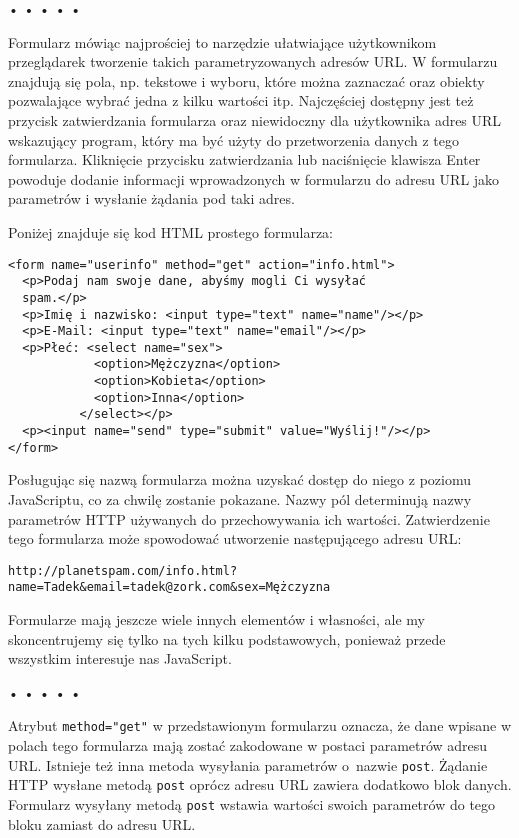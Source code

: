 \begin{center}
• • • • •
\end{center}

  
Formularz mówiąc najprościej to narzędzie ułatwiające użytkownikom przeglądarek tworzenie takich parametryzowanych adresów URL. W formularzu znajdują się pola, np. tekstowe i wyboru, które można zaznaczać oraz obiekty pozwalające wybrać jedna z kilku wartości itp. Najczęściej dostępny jest też przycisk zatwierdzania formularza oraz niewidoczny dla użytkownika adres URL wskazujący program, który ma być użyty do przetworzenia danych z tego formularza. Kliknięcie przycisku zatwierdzania lub naciśnięcie klawisza Enter powoduje dodanie informacji wprowadzonych w formularzu do adresu URL jako parametrów i wysłanie żądania pod taki adres.

  
Poniżej znajduje się kod HTML prostego formularza:

  
\begin{verbatim} 
<form name="userinfo" method="get" action="info.html">
  <p>Podaj nam swoje dane, abyśmy mogli Ci wysyłać
  spam.</p>
  <p>Imię i nazwisko: <input type="text" name="name"/></p>
  <p>E-Mail: <input type="text" name="email"/></p>
  <p>Płeć: <select name="sex">
            <option>Mężczyzna</option>
            <option>Kobieta</option>
            <option>Inna</option>
          </select></p>
  <p><input name="send" type="submit" value="Wyślij!"/></p>
</form>
 \end{verbatim}
  
Posługując się nazwą formularza można uzyskać dostęp do niego z poziomu JavaScriptu, co za chwilę zostanie pokazane. Nazwy pól determinują nazwy parametrów HTTP używanych do przechowywania ich wartości. Zatwierdzenie tego formularza może spowodować utworzenie następującego adresu URL:

  
\begin{verbatim} 
http://planetspam.com/info.html?name=Tadek&email=tadek@zork.com&sex=Mężczyzna
\end{verbatim}
  
Formularze mają jeszcze wiele innych elementów i własności, ale my skoncentrujemy się tylko na tych kilku podstawowych, ponieważ przede wszystkim interesuje nas JavaScript.



\begin{center}
• • • • •
\end{center}

  
Atrybut \texttt{method="get"} w przedstawionym formularzu oznacza, że dane wpisane w polach tego formularza mają zostać zakodowane w postaci parametrów adresu URL. Istnieje też inna metoda wysyłania parametrów o~nazwie \texttt{post}. Żądanie HTTP wysłane metodą \texttt{post} oprócz adresu URL zawiera dodatkowo blok danych. Formularz wysyłany metodą \texttt{post} wstawia wartości swoich parametrów do tego bloku zamiast do adresu URL.


